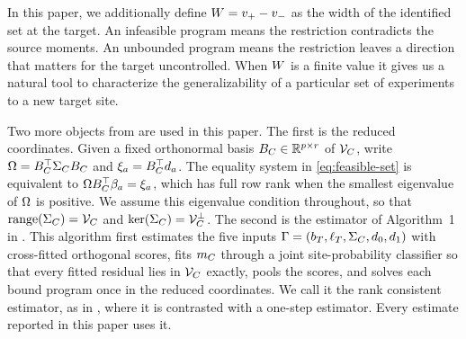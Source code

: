 In this paper, we additionally define $W=v_{+}-v_{-}$ as the width of the identified set at the
target. An infeasible program means the restriction contradicts the
source moments. An unbounded program means the restriction leaves a
direction that matters for the target uncontrolled. When $W$ is a finite value it gives us a natural tool to characterize the generalizability of a particular set of experiments to a new target site.

Two more objects from \citet{boyarsky2026} are used in this paper. The
first is the reduced coordinates. Given a fixed orthonormal basis $B_C\in\mathbb{R}^{p\times
r}$ of $\mathcal V_C$, write $\Omega=B_C^\top\Sigma_CB_C$ and
$\xi_{a}=B_C^\top d_{a}$. The equality system in
\eqref{eq:feasible-set} is equivalent to
$\Omega B_C^\top\beta_a=\xi_{a}$, which has full row rank when the
smallest eigenvalue of $\Omega$ is positive. We assume this eigenvalue
condition throughout, so that
$\operatorname{range}(\Sigma_C)=\mathcal V_C$ and $\operatorname{ker}(\Sigma_C)=\mathcal V_C^\perp$. The second is the estimator of Algorithm~1 in \citet{boyarsky2026}. This algorithm first estimates the five inputs
$\Gamma=(b_T,\ell_T,\Sigma_C,d_{0},d_{1})$ with cross-fitted
orthogonal scores, fits $m_C$ through a joint site-probability
classifier so that every fitted residual lies in $\mathcal V_C$ exactly, pools
the scores, and solves each bound program once in the reduced
coordinates. We call it the rank consistent estimator, as in \citet{boyarsky2026}, where it is contrasted with a one-step
estimator. Every estimate reported in this paper uses it.
